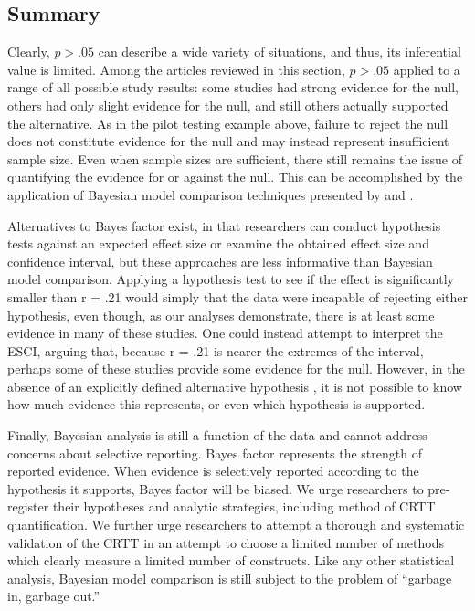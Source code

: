 \documentclass[fignum,nobf,man]{apa}
\begin{document}
\subsection{Summary}
Clearly, $p > .05$ can describe a wide variety of situations, and thus, its inferential value is limited. Among the articles reviewed in this section, $p > .05$ applied to a range of all possible study results: some studies had strong evidence for the null, others had only slight evidence for the null, and still others actually supported the alternative. As in the pilot testing example above, failure to reject the null does not constitute evidence for the null and may instead represent insufficient sample size. Even when sample sizes are sufficient, there still remains the issue of quantifying the evidence for or against the null. This can be accomplished by the application of Bayesian model comparison techniques presented by \citet{Rouder:Morey:2012, Rouder:etal:2012}
and \citet{Dienes:2011, Dienes:2014}. %

Alternatives to Bayes factor exist, in that researchers can conduct hypothesis tests against an expected effect size or examine the obtained effect size and confidence interval, but these approaches are less informative than Bayesian model comparison. Applying a hypothesis test to see if the effect is significantly smaller than r = .21 would simply that the data were incapable of rejecting either hypothesis, even though, as our analyses demonstrate, there is at least some evidence in many of these studies. One could instead attempt to interpret the ESCI, arguing that, because r = .21 is nearer the extremes of the interval, perhaps some of these studies provide some evidence for the null. However, in the absence of an explicitly defined alternative hypothesis %
, it is not possible to know how much evidence this represents, or even which hypothesis is supported.

Finally, Bayesian analysis is still a function of the data and cannot address concerns about selective reporting. Bayes factor represents the strength of reported evidence. When evidence is selectively reported according to the hypothesis it supports, Bayes factor will be biased. We urge researchers to pre-register their hypotheses and analytic strategies, including method of CRTT quantification. We further urge researchers to attempt a thorough and systematic validation of the CRTT in an attempt to choose a limited number of methods which clearly measure a limited number of constructs. Like any other statistical analysis, Bayesian model comparison is still subject to the problem of ``garbage in, garbage out.'' %
\end{document}

